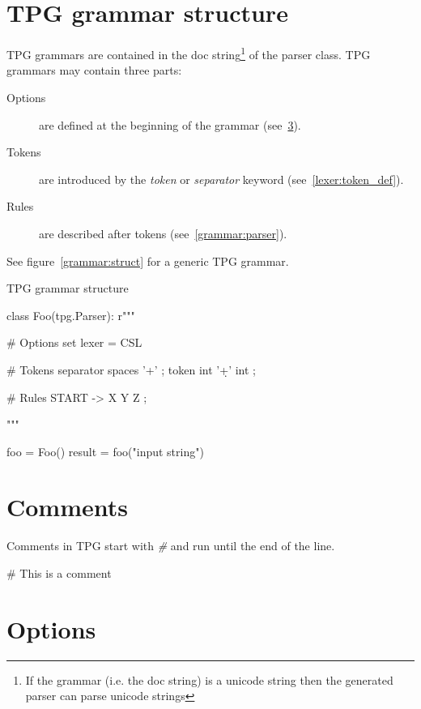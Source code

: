 \section{TPG grammar structure}

TPG grammars are contained in the doc string\footnote{If the grammar (i.e. the doc string) is a unicode string then the generated parser can parse unicode strings} of the parser class.
TPG grammars may contain three parts:

\begin{description}
    \item [Options]
        are defined at the beginning of the grammar (see~\ref{grammar:options}).
    \item [Tokens]
        are introduced by the \emph{token} or \emph{separator} keyword (see~\ref{lexer:token_def}).
    \item [Rules]
        are described after tokens (see~\ref{grammar:parser}).
\end{description}

See figure~\ref{grammar:struct} for a generic TPG grammar.

\begin{code}
\caption{TPG grammar structure}                             \label{grammar:struct}
\begin{verbatimtab}[4]
class Foo(tpg.Parser):
    r"""

        # Options
        set lexer = CSL

        # Tokens
        separator spaces    '\s+'       ;
        token int           '\d+'   int ;

        # Rules
        START -> X Y Z ;

    """

foo = Foo()
result = foo("input string")
\end{verbatimtab}
\end{code}

\section{Comments}

Comments in TPG start with \emph{\#} and run until the end of the line.

\begin{verbatimtab}[4]
    # This is a comment
\end{verbatimtab}

\section{Options}                                           \label{grammar:options}

